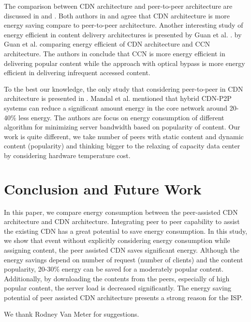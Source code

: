 \documentclass[JIP]{ipsj}
\begin{document}
The comparison between CDN architecture and peer-to-peer architecture are discussed in \cite{baliga2007energy} and \cite{feldmann2010energy}.
Both authors in \cite{baliga2007energy} and \cite{feldmann2010energy} agree that CDN architecture is more energy saving compare to peer-to-peer architecture. 
Another interesting study of energy efficient in content delivery architectures is presented by Guan et al. \cite{5963557}.
by Guan et al. \cite{5963557} comparing energy efficient of CDN architecture and CCN architecture.
The authors in \cite{5963557} conclude that CCN is more energy efficient in delivering popular content while the approach with optical bypass is more energy efficient in delivering infrequent accessed content.

To the best our knowledge, the only study that considering peer-to-peer in CDN architecture is presented in \cite{6524219}.
Mandal et al. \cite{6524219} mentioned that hybrid CDN-P2P systems can reduce a significant amount energy in the core network around 20-40\% less energy.  
The authors are focus on energy consumption of different algorithm for minimizing server bandwidth based on popularity of content.  
Our work is quite different, we take number of peers with static content and dynamic content (popularity) and thinking bigger to the relaxing of capacity data center by considering hardware temperature cost.

 


\section{Conclusion and Future Work}\label{conclusion}

In this paper, we compare energy consumption between the peer-assisted CDN architecture and CDN architecture. 
Integrating peer to peer capability to assist the existing CDN has a great potential to save energy consumption.
In this study, we show that event without explicitly considering energy consumption while assigning content, the peer assisted CDN saves significant energy.
Although the energy savings depend on number of request (number of clients) and the content popularity, 20-30\% energy can be saved for a moderately popular content.
Additionally, by downloading the contents from the peers, especially of high popular content, the server load is decreased significantly.
The energy saving potential of peer assisted CDN architecture presents a strong reason for the ISP.  

\begin{acknowledgment}
We thank Rodney Van Meter for suggestions.
\end{acknowledgment}
\end{document}
